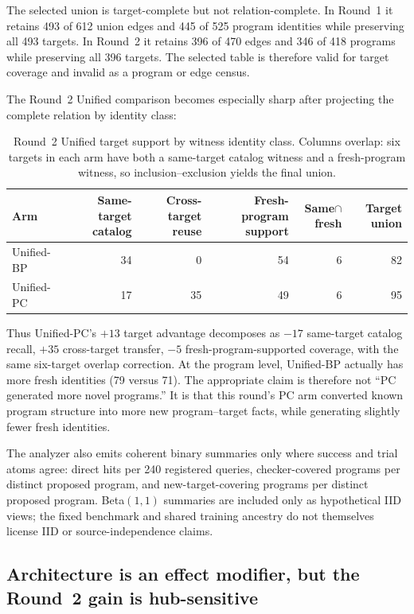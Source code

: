 \documentclass[11pt,openany]{report}
\begin{document}
The selected union is target-complete but not relation-complete.  In Round~1
it retains 493 of 612 union edges and 445 of 525 program identities while
preserving all 493 targets.  In Round~2 it retains 396 of 470 edges and 346 of
418 programs while preserving all 396 targets.  The selected table is
therefore valid for target coverage and invalid as a program or edge census.

The Round~2 Unified comparison becomes especially sharp after projecting the
complete relation by identity class:

\begin{table}[htbp]
\centering
\caption{Round~2 Unified target support by witness identity class.  Columns
overlap: six targets in each arm have both a same-target catalog witness and a
fresh-program witness, so inclusion--exclusion yields the final union.}
\label{tab:unified-relational-decomposition}
\small
\begin{tabular}{lrrrrr}
\toprule
Arm & Same-target catalog & Cross-target reuse & Fresh-program support
    & Same$\cap$fresh & Target union \\
\midrule
Unified-BP & 34 & 0  & 54 & 6 & 82 \\
Unified-PC & 17 & 35 & 49 & 6 & 95 \\
\bottomrule
\end{tabular}
\end{table}

Thus Unified-PC's $+13$ target advantage decomposes as $-17$ same-target
catalog recall, $+35$ cross-target transfer, $-5$ fresh-program-supported
coverage, with the same six-target overlap correction.  At the program level,
Unified-BP actually has more fresh identities (79 versus 71).  The appropriate
claim is therefore not ``PC generated more novel programs.''  It is that this
round's PC arm converted known program structure into more new
program--target facts, while generating slightly fewer fresh identities.

The analyzer also emits coherent binary summaries only where success and
trial atoms agree: direct hits per 240 registered queries, checker-covered
programs per distinct proposed program, and new-target-covering programs per
distinct proposed program.  Beta$(1,1)$ summaries are included only as
hypothetical IID views; the fixed benchmark and shared training ancestry do
not themselves license IID or source-independence claims.

\subsection{Architecture is an effect modifier, but the Round~2 gain is
hub-sensitive}
\end{document}
